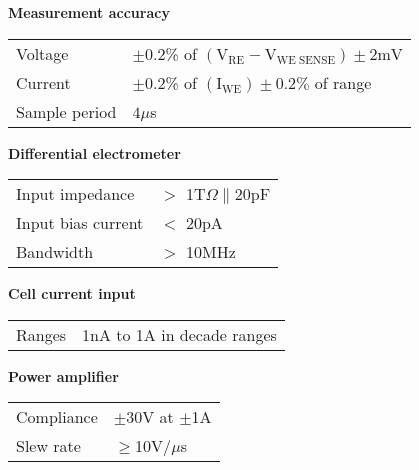 
\setlength{\topmargin}{-0.5in}
\setlength{\oddsidemargin}{-0.5in}
\setlength{\textwidth}{7.5in}
\setlength{\columnsep}{0.5in}
\setlength{\columnseprule}{1pt}
\setlength{\textheight}{8.75in}
\setlength{\extrarowheight}{0.5mm}


\newcommand{\atspace}{1in} %
\newcommand{\valspace}{2.2in} %
\newcolumntype{R}{>{\raggedright}m{\atspace}m{\valspace}}



\thispagestyle{empty}
\twocolumn


\noindent \textbf{Measurement accuracy}
\medskip \\ \bigskip
\begin{tabular}{R}
    Voltage & $\pm$0.2\% of $\left( \mathrm{V_{RE} - V_{WE \; SENSE}} \right) \pm \mathrm{2mV}$\\
    Current & $\pm$0.2\% of $\left( \mathrm{I_{WE}} \right) \pm 0.2\%$ of range \\
    Sample period & $4\mu$s\\
\end{tabular}

\noindent \textbf{Differential electrometer}
\medskip \\ \bigskip
\begin{tabular}{R}
    Input impedance     & $>$ 1T$\Omega \parallel 20$pF\\
    Input bias current  & $<$ 20pA\\
    Bandwidth           & $>$ 10MHz
\end{tabular}

\noindent \textbf{Cell current input}
\medskip \\ \bigskip
\begin{tabular}{R}
    Ranges    &1nA to 1A in decade ranges\\
\end{tabular}


\noindent \textbf{Power amplifier}
\medskip \\ \medskip
\begin{tabular}{R}
    Compliance  &  $\pm$30V at $\pm$1A \\
    Slew rate   & $\geq$10V/$\mu$s \\
\end{tabular}


